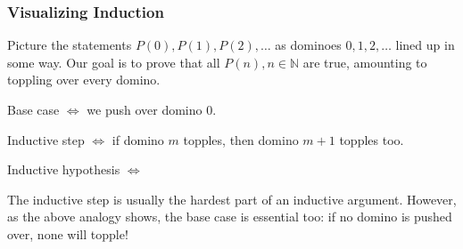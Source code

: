 \documentclass[11pt, draft]{article}
\begin{document}
\subsubsection{Visualizing Induction}

Picture the statements $P(0), P(1), P(2), \ldots$ as dominoes $0, 1, 2, \ldots$
lined up in some way. Our goal is to prove that all $P(n), n \in \mathbb{N}$
are true, amounting to toppling over every domino.

\begin{center}
\end{center}
\begin{center}
\end{center}
Base case $\Leftrightarrow$ we push over domino 0.

Inductive step $\Leftrightarrow$ if domino $m$ topples, then domino $m+1$
topples too.

Inductive hypothesis $\Leftrightarrow$

\begin{remark}The inductive step is usually the hardest part of an inductive argument. However, as the above analogy shows, the base case is essential too: if no domino is pushed over, none will topple!
\end{remark}
\end{document}
